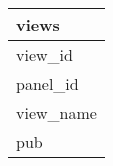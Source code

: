 \documentclass{article}
\begin{document}

\begin{tabular}{|l|} \hline
\textbf{views} \\ \hline
view\_id \\ \hline
panel\_id \\ \hline
view\_name \\ \hline
pub \\ \hline
\end{tabular}
\end{document}
